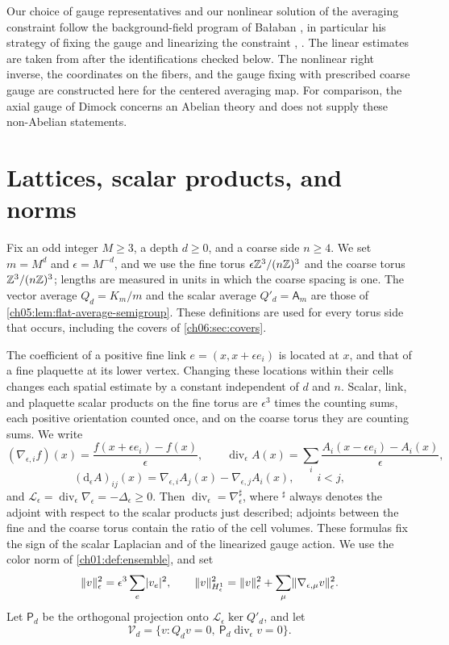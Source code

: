 Our choice of gauge representatives and our nonlinear solution of the averaging constraint follow the background-field program of Bałaban \cite{Balaban1985Regular,Balaban1985Variational}, in particular his strategy of fixing the gauge and linearizing the constraint \cite[Theorem~2, p.~83]{Balaban1985Regular}, \cite[Theorem~1, p.~279]{Balaban1985Variational}. The linear estimates are taken from \cite{Balaban1984I,Balaban1984II,Balaban1985Background} after the identifications checked below. The nonlinear right inverse, the coordinates on the fibers, and the gauge fixing with prescribed coarse gauge are constructed here for the centered averaging map. For comparison, the axial gauge of Dimock \cite{Dimock2015Axial} concerns an Abelian theory and does not supply these non-Abelian statements.

\section{Lattices, scalar products, and norms}\label{ch06:sec:spaces}

Fix an odd integer $M\ge3$, a depth $d\ge0$, and a coarse side $n\ge4$. We set $m=M^d$ and $\epsilon=M^{-d}$, and we use the fine torus $\epsilon\mathbb Z^3/(n\mathbb Z)^3$ and the coarse torus $\mathbb Z^3/(n\mathbb Z)^3$; lengths are measured in units in which the coarse spacing is one. The vector average $Q_d=K_m/m$ and the scalar average $Q'_d=\mathsf A_m$ are those of \cref{ch05:lem:flat-average-semigroup}. These definitions are used for every torus side that occurs, including the covers of \cref{ch06:sec:covers}.

The coefficient of a positive fine link $e=(x,x+\epsilon e_i)$ is located at $x$, and that of a fine plaquette at its lower vertex. Changing these locations within their cells changes each spatial estimate by a constant independent of $d$ and $n$. Scalar, link, and plaquette scalar products on the fine torus are $\epsilon^3$ times the counting sums, each positive orientation counted once, and on the coarse torus they are counting sums. We write
\[
 (\nabla_{\epsilon,i}f)(x)=\frac{f(x+\epsilon e_i)-f(x)}\epsilon,\qquad
 \operatorname{div}_\epsilon A(x)=\sum_i\frac{A_i(x-\epsilon e_i)-A_i(x)}\epsilon,
\]
\[
 (\mathrm d_\epsilon A)_{ij}(x)=\nabla_{\epsilon,i}A_j(x)-\nabla_{\epsilon,j}A_i(x),\qquad i<j,
\]
and $\mathscr L_\epsilon=\operatorname{div}_\epsilon\nabla_\epsilon=-\Delta_\epsilon\ge0$. Then $\operatorname{div}_\epsilon=\nabla_\epsilon^\sharp$, where $^\sharp$ always denotes the adjoint with respect to the scalar products just described; adjoints between the fine and the coarse torus contain the ratio of the cell volumes. These formulas fix the sign of the scalar Laplacian and of the linearized gauge action. We use the color norm of \cref{ch01:def:ensemble}, and set
\[
 \lVert v\rVert_\epsilon^2=\epsilon^3\sum_e\lvert v_e\rvert^2,\qquad\lVert v\rVert_{H^1_\epsilon}^2=\lVert v\rVert_\epsilon^2+\sum_\mu\lVert \nabla_{\epsilon,\mu}v\rVert_\epsilon^2.
\]
Let $\mathsf P_d$ be the orthogonal projection onto $\mathscr L_\epsilon\ker Q'_d$, and let
\[
 \mathcal V_d=\{v:Q_dv=0,\ \mathsf P_d\operatorname{div}_\epsilon v=0\}.
\]

